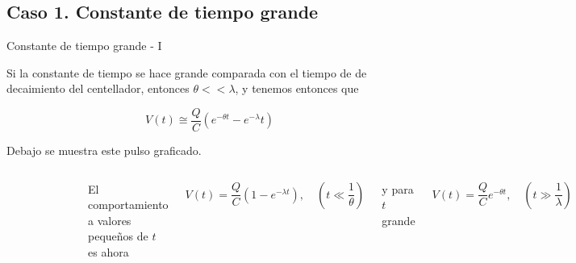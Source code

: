 \documentclass[a4paper,10pt]{beamer}
\begin{document}
\subsection{Caso 1. Constante de tiempo grande}

\begin{frame}{Constante de tiempo grande - I}
 
 Si la constante de tiempo se hace grande comparada con el tiempo de de decaimiento del 
 centellador, entonces $\theta << \lambda$, y tenemos entonces que 
 
 \begin{equation}
  V(t) \cong \frac{Q}{C}(e^{-\theta t} - e^{-\lambda} t)
 \end{equation}
 
 Debajo se muestra este pulso graficado. 

 \begin{columns}[c]
 
 \column{2in}
 
 \begin{figure}
  \center
  \includegraphics[scale=0.3]{fig45}
  \end{figure}

 
 \column{2in}
  El comportamiento a valores pequeños de $t$ es ahora
  
  \begin{equation*}
   V(t) = \frac{Q}{C}(1 - e^{-\lambda t}), \quad \left(t \ll \frac{1}{\theta} \right)
  \end{equation*}
  
  y para $t$ grande 
  
  \begin{equation*}
   V(t) = \frac{Q}{C}e^{-\theta t}, \quad \left(t \gg \frac{1}{\lambda} \right)
  \end{equation*}
 
 \end{columns}

\end{frame}
\end{document}
